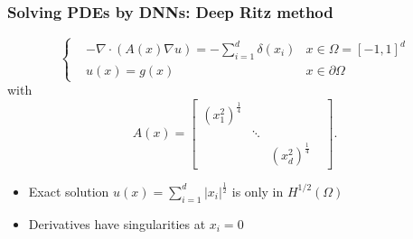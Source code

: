 \documentclass[aspectratio=169]{beamer}
\begin{document}
\begin{frame}
\frametitle{Solving PDEs by DNNs: Deep Ritz method }

\begin{equation*}
\left\{
\begin{aligned}
&-\nabla \cdot ( A(x) \nabla u) = - \sum_{i=1}^d\delta(x_i) & x\in \Omega=[-1,1]^d\\
&u(x) = g(x)  & x\in \partial \Omega
\end{aligned}\right.
\end{equation*} 
with
\begin{equation*}
	A(x)= 
	\left[\begin{matrix}
		(x_1^2)^{\frac{1}{4}} & & \\
		& \ddots & &\\
		& &  (x_d^2)^{\frac{1}{4}}
	\end{matrix}\right].
\end{equation*}
\begin{itemize}
	\item Exact solution $u(x)= \sum_{i=1}^d|x_i|^{\frac{1}{2}}$ is only in $H^{1/2}(\Omega)$ 
	\item Derivatives have singularities at $x_i =0$
\end{itemize}

\end{frame}
\end{document}
